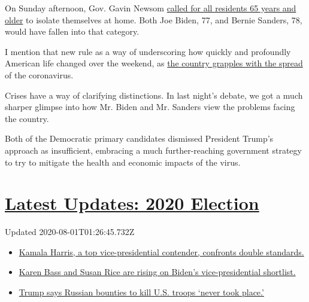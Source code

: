 On Sunday afternoon, Gov. Gavin Newsom
\href{https://www.nytimes.com/2020/03/15/us/coronavirus-newsom-california-seniors-restaurants-bars.html}{called
for all residents 65 years and older} to isolate themselves at home.
Both Joe Biden, 77, and Bernie Sanders, 78, would have fallen into that
category.

I mention that new rule as a way of underscoring how quickly and
profoundly American life changed over the weekend, as
\href{https://www.nytimes.com/live/2020/coronavirus-usa}{the country
grapples with the spread} of the coronavirus.

Crises have a way of clarifying distinctions. In last night's debate, we
got a much sharper glimpse into how Mr. Biden and Mr. Sanders view the
problems facing the country.

Both of the Democratic primary candidates dismissed President Trump's
approach as insufficient, embracing a much further-reaching government
strategy to try to mitigate the health and economic impacts of the
virus.

\hypertarget{latest-updates-2020-election}{%
\section{\texorpdfstring{\href{https://www.nytimes.com/2020/07/31/us/elections/biden-vs-trump.html?action=click\&pgtype=Article\&state=default\&region=MAIN_CONTENT_1\&context=storylines_live_updates}{Latest
Updates: 2020
Election}}{Latest Updates: 2020 Election}}\label{latest-updates-2020-election}}

Updated 2020-08-01T01:26:45.732Z

\begin{itemize}
\tightlist
\item
  \href{https://www.nytimes.com/2020/07/31/us/elections/biden-vs-trump.html?action=click\&pgtype=Article\&state=default\&region=MAIN_CONTENT_1\&context=storylines_live_updates\#link-29fdff45}{Kamala
  Harris, a top vice-presidential contender, confronts double
  standards.}
\item
  \href{https://www.nytimes.com/2020/07/31/us/elections/biden-vs-trump.html?action=click\&pgtype=Article\&state=default\&region=MAIN_CONTENT_1\&context=storylines_live_updates\#link-13ec3d9c}{Karen
  Bass and Susan Rice are rising on Biden's vice-presidential
  shortlist.}
\item
  \href{https://www.nytimes.com/2020/07/31/us/elections/biden-vs-trump.html?action=click\&pgtype=Article\&state=default\&region=MAIN_CONTENT_1\&context=storylines_live_updates\#link-49e9a016}{Trump
  says Russian bounties to kill U.S. troops `never took place.'}
\end{itemize}

